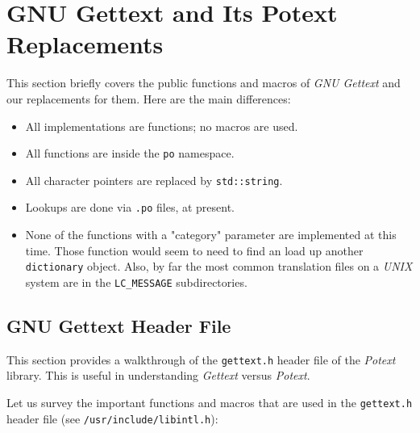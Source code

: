 %
%
%

\section{GNU Gettext and Its Potext Replacements}
\label{subsec:gettext_code}

   This section briefly covers the public functions and macros of
   \textsl{GNU Gettext} and our replacements for them.
   Here are the main differences:

   \begin{itemize}
      \item All implementations are functions; no macros are used.
      \item All functions are inside the \texttt{po} namespace.
      \item All character pointers are replaced by \texttt{std::string}.
      \item Lookups are done via \texttt{.po} files, at present.
      \item None of the functions with a "category" parameter are
         implemented at this time.
         Those function would seem to need to find an load up another
         \texttt{dictionary} object.
         Also, by far the most common translation files on a \textsl{UNIX}
         system are in the \texttt{LC\_MESSAGE} subdirectories.
   \end{itemize}

\subsection{GNU Gettext Header File}
\label{subsec:gettext_gnu_header_file}

   This section provides a walkthrough of the \texttt{gettext.h} header file
   of the \textsl{Potext} library.
   This is useful in understanding \textsl{Gettext} versus \textsl{Potext}.

   Let us survey the important functions and macros that are used in
   the \texttt{gettext.h} header file
   (see \texttt{/usr/include/libintl.h}):

